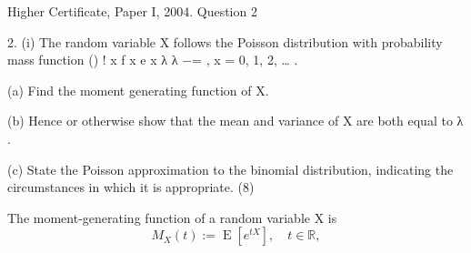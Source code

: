 \documentclass[a4paper,12pt]{article}
\begin{document}
Higher Certificate, Paper I, 2004. Question 2

\begin{framed}
2. (i) The random variable X follows the Poisson distribution with probability mass function () ! x f x e x λ λ −= ,    x = 0, 1, 2, … . 
 
(a) Find the moment generating function of X. 
 
(b) Hence or otherwise show that the mean and variance of X are both equal to λ . 
 
(c) State the Poisson approximation to the binomial distribution, indicating the circumstances in which it is appropriate. (8) 
 
\end{framed}

The moment-generating function of a random variable X is 
\[{\displaystyle M_{X}(t):=\operatorname {E} \left[e^{tX}\right],\quad t\in \mathbb {R} ,} \]
\end{document}
